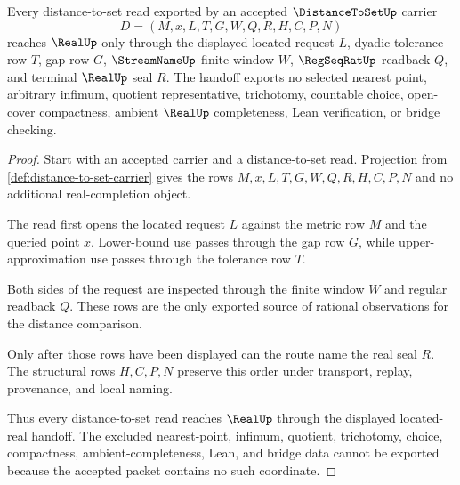 \begin{theorem}
\label{thm:distance-to-set-located-real-handoff}
Every distance-to-set read exported by an accepted $\DistanceToSetUp$ carrier
$$
D=(M,x,L,T,G,W,Q,R,H,C,P,N)
$$
reaches $\RealUp$ only through the displayed located request $L$, dyadic tolerance row $T$, gap row $G$, $\StreamNameUp$ finite window $W$, $\RegSeqRatUp$ readback $Q$, and terminal $\RealUp$ seal $R$. The handoff exports no selected nearest point, arbitrary infimum, quotient representative, trichotomy, countable choice, open-cover compactness, ambient $\RealUp$ completeness, Lean verification, or bridge checking.
\end{theorem}
\begin{proof}
Start with an accepted carrier and a distance-to-set read. Projection from \autoref{def:distance-to-set-carrier} gives the rows $M,x,L,T,G,W,Q,R,H,C,P,N$ and no additional real-completion object.

The read first opens the located request $L$ against the metric row $M$ and the queried point $x$. Lower-bound use passes through the gap row $G$, while upper-approximation use passes through the tolerance row $T$.

Both sides of the request are inspected through the finite window $W$ and regular readback $Q$. These rows are the only exported source of rational observations for the distance comparison.

Only after those rows have been displayed can the route name the real seal $R$. The structural rows $H,C,P,N$ preserve this order under transport, replay, provenance, and local naming.

Thus every distance-to-set read reaches $\RealUp$ through the displayed located-real handoff. The excluded nearest-point, infimum, quotient, trichotomy, choice, compactness, ambient-completeness, Lean, and bridge data cannot be exported because the accepted packet contains no such coordinate.
\end{proof}



